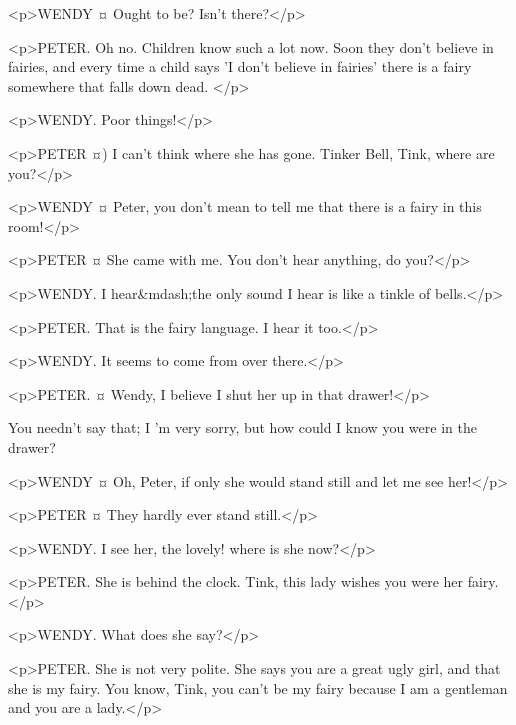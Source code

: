 <p>WENDY ¤
Ought to be? Isn't there?</p>

<p>PETER. Oh no. Children know such a lot now. Soon they don't believe in fairies, and every time a child says 'I don't believe in fairies' there is a fairy somewhere that falls down dead.
</p>

<p>WENDY. Poor things!</p>

<p>PETER ¤)
I can't think where she has gone. Tinker Bell, Tink, where are you?</p>

<p>WENDY ¤
Peter, you don't mean to tell me that there is a fairy in this room!</p>

<p>PETER ¤
She came with me. You don't hear anything, do you?</p>

<p>WENDY. I hear&mdash;the only sound I hear is like a tinkle of bells.</p>

<p>PETER. That is the fairy language. I hear it too.</p>

<p>WENDY. It seems to come from over there.</p>

<p>PETER. ¤
Wendy, I believe I shut her up in that drawer!</p>


You needn't say that; I 'm very sorry, but how could I know you were in the drawer? 

<p>WENDY ¤
Oh, Peter, if only she would stand still and let me see her!</p>

<p>PETER ¤
They hardly ever stand still.</p>


<p>WENDY. I see her, the lovely! where is she now?</p>

<p>PETER. She is behind the clock. Tink, this lady wishes you were her fairy.
</p>

<p>WENDY. What does she say?</p>

<p>PETER. She is not very polite. She says you are a great ugly girl, and that she is my fairy. You know, Tink, you can't be my fairy because I am a gentleman and you are a lady.</p>


